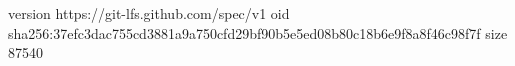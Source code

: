 version https://git-lfs.github.com/spec/v1
oid sha256:37efc3dac755cd3881a9a750cfd29bf90b5e5ed08b80c18b6e9f8a8f46c98f7f
size 87540
